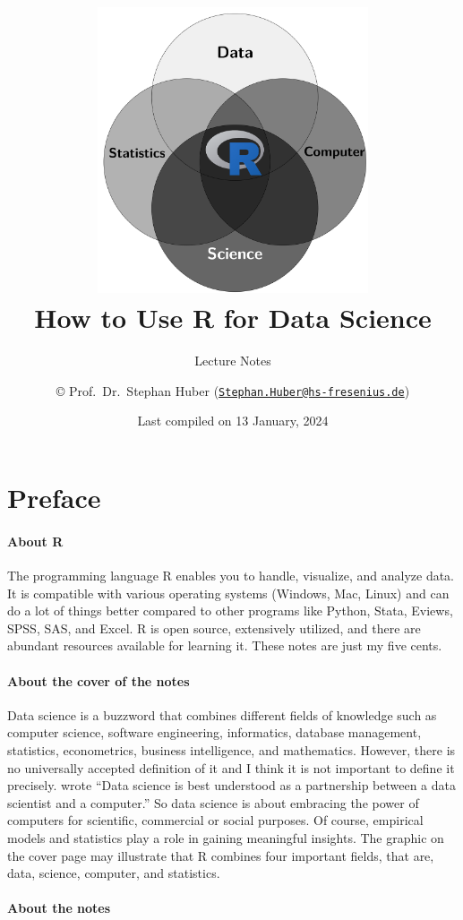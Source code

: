 \documentclass[
  12pt,
  oneside]{book}
\title{\includegraphics[width=8cm,height=\textheight]{fig/cover.png}\\
How to Use R for Data Science}
\subtitle{Lecture Notes}
\author{© Prof.~Dr.~Stephan Huber (\href{mailto:Stephan.Huber@hs-fresenius.de}{\nolinkurl{Stephan.Huber@hs-fresenius.de}})}
\date{Last compiled on 13 January, 2024}
\begin{document}
\maketitle

{
\hypersetup{linkcolor=}
\setcounter{tocdepth}{2}
\tableofcontents
}
\hypertarget{preface}{%
\chapter*{Preface}\label{preface}}

\hypertarget{about-r}{%
\subsubsection*{About R}\label{about-r}}

The programming language R enables you to handle, visualize, and analyze data. It is compatible with various operating systems (Windows, Mac, Linux) and can do a lot of things better compared to other programs like Python, Stata, Eviews, SPSS, SAS, and Excel. R is open source, extensively utilized, and there are abundant resources available for learning it. These notes are just my five cents.

\hypertarget{about-the-cover-of-the-notes}{%
\subsubsection*{About the cover of the notes}\label{about-the-cover-of-the-notes}}

Data science is a buzzword that combines different fields of knowledge such as computer science, software engineering, informatics, database management, statistics, econometrics, business intelligence, and mathematics. However, there is no universally accepted definition of it and I think it is not important to define it precisely. \citet[p.~97]{Kelleher2018Data} wrote ``Data science is best understood as a partnership between a data scientist and a computer.'' So data science is about embracing the power of computers for scientific, commercial or social purposes. Of course, empirical models and statistics play a role in gaining meaningful insights. The graphic on the cover page may illustrate that R combines four important fields, that are, data, science, computer, and statistics.

\hypertarget{about-the-notes}{%
\subsubsection*{About the notes}\label{about-the-notes}}
\end{document}
